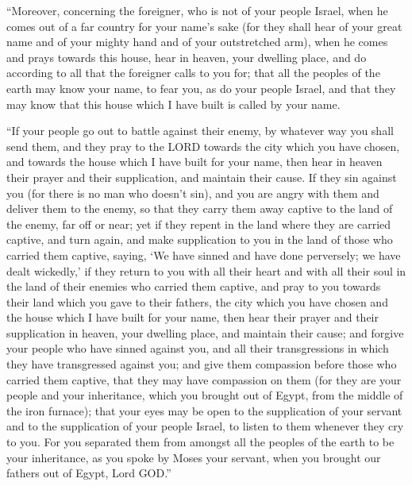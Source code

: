  ``Moreover, concerning the foreigner, who is not of your
people Israel, when he comes out of a far country for your name's sake
 (for they shall hear of your great name and of your
mighty hand and of your outstretched arm), when he comes and prays
towards this house,  hear in heaven, your dwelling place,
and do according to all that the foreigner calls to you for; that all
the peoples of the earth may know your name, to fear you, as do your
people Israel, and that they may know that this house which I have built
is called by your name.

 ``If your people go out to battle against their enemy,
by whatever way you shall send them, and they pray to the LORD towards
the city which you have chosen, and towards the house which I have built
for your name,  then hear in heaven their prayer and
their supplication, and maintain their cause.  If they
sin against you (for there is no man who doesn't sin), and you are angry
with them and deliver them to the enemy, so that they carry them away
captive to the land of the enemy, far off or near;  yet
if they repent in the land where they are carried captive, and turn
again, and make supplication to you in the land of those who carried
them captive, saying, `We have sinned and have done perversely; we have
dealt wickedly,'  if they return to you with all their
heart and with all their soul in the land of their enemies who carried
them captive, and pray to you towards their land which you gave to their
fathers, the city which you have chosen and the house which I have built
for your name,  then hear their prayer and their
supplication in heaven, your dwelling place, and maintain their cause;
 and forgive your people who have sinned against you, and
all their transgressions in which they have transgressed against you;
and give them compassion before those who carried them captive, that
they may have compassion on them  (for they are your
people and your inheritance, which you brought out of Egypt, from the
middle of the iron furnace);  that your eyes may be open
to the supplication of your servant and to the supplication of your
people Israel, to listen to them whenever they cry to you.
 For you separated them from amongst all the peoples of
the earth to be your inheritance, as you spoke by Moses your servant,
when you brought our fathers out of Egypt, Lord GOD.''

